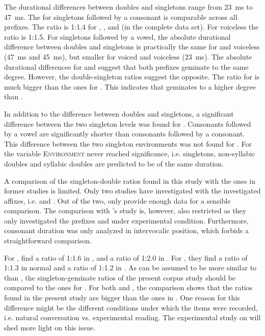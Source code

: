 The durational differences between doubles and singletons range from 23~ms to 47~ms.  The   for singletons followed by a consonant is comparable across all prefixes. The ratio is 1:1.4 for , , and  (in the complete data set). For voiceless  the ratio is 1:1.5.
For singletons followed by a vowel, the absolute durational difference between doubles and singletons is practically the same for  and voiceless  (47~ms and 45~ms), but smaller for voiced and voiceless  (23~ms). The absolute durational differences for  and  suggest that both prefixes geminate to the same degree. However, the double-singleton ratios suggest the opposite. The ratio for  is much bigger than the ones for . This indicates that  geminates to a higher degree than .


In addition to the difference between doubles and singletons, a significant difference between the two singleton levels was found for . Consonants followed by a vowel are significantly shorter than consonants followed by a consonant. This difference between the two singleton environments was not found for . For  the variable \textsc{Environment} never reached significance, i.e. singletons, non-syllabic doubles and syllabic doubles are predicted to be of the same duration.

 A comparison of the singleton-double ratios found in this study with the ones in former studies is limited. Only two studies have investigated  with the investigated affixes, i.e. \cite{Kaye.2005} and \cite{Oh.2012}. Out of the two, only \cite{Oh.2012} provide enough data for a sensible comparison. The comparison with \citeauthor{Oh.2012}'s study is, however, also restricted as they only investigated the prefixes  and  under experimental condition. Furthermore, consonant duration was only analyzed in intervocalic position, which forbids a straightforward comparison. 
 
 For , \cite{Oh.2012} find a ratio of 1:1.6 in , and a ratio of 1:2.0 in . For , they find a ratio of 1:1.3 in normal and a ratio of 1:1.2 in . 
 As  can be assumed to be more similar to  than , the singleton-geminate ratios of the present corpus study should be compared to the ones for . 
 For both  and , the comparison shows that the ratios found in the present study are bigger than the ones in \cite{Oh.2012}. 
  One reason for this difference might be the different conditions under which the items were recorded, i.e. natural conversation vs. experimental reading. The experimental study on  will shed more light on this issue.

